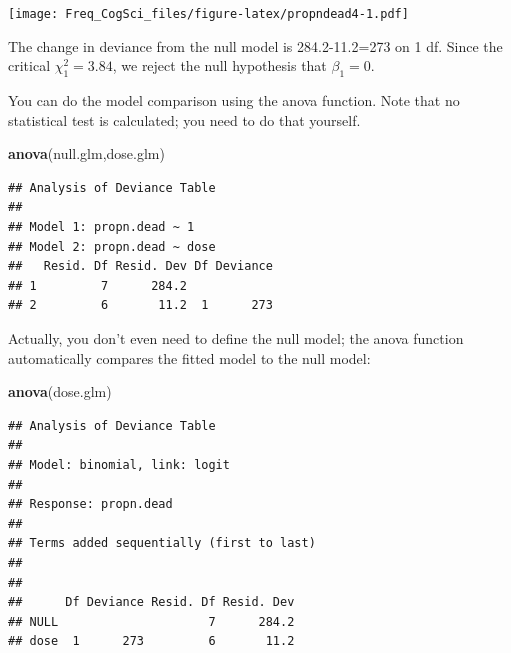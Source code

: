 \documentclass[12pt,]{krantz}
\newenvironment{Shaded}{\begin{snugshade}}{\end{snugshade}}
\newcommand{\DataTypeTok}[1]{\textcolor[rgb]{0.13,0.29,0.53}{#1}}
\newcommand{\DecValTok}[1]{\textcolor[rgb]{0.00,0.00,0.81}{#1}}
\newcommand{\KeywordTok}[1]{\textcolor[rgb]{0.13,0.29,0.53}{\textbf{#1}}}
\newcommand{\NormalTok}[1]{#1}
\newcommand{\OperatorTok}[1]{\textcolor[rgb]{0.81,0.36,0.00}{\textbf{#1}}}
\newcommand{\StringTok}[1]{\textcolor[rgb]{0.31,0.60,0.02}{#1}}
\begin{document}
\begin{Shaded}
\end{Shaded}

\texttt{[image: Freq\_CogSci\_files/figure-latex/propndead4-1.pdf]}

The change in deviance from the null model is 284.2-11.2=273 on 1 df. Since the critical \(\chi_1^2 = 3.84\), we reject the null hypothesis that \(\beta_1 = 0\).

You can do the model comparison using the anova function. Note that no statistical test is calculated; you need to do that yourself.

\begin{Shaded}
\begin{Highlighting}[]
\KeywordTok{anova}\NormalTok{(null.glm,dose.glm)}
\end{Highlighting}
\end{Shaded}

\begin{verbatim}
## Analysis of Deviance Table
## 
## Model 1: propn.dead ~ 1
## Model 2: propn.dead ~ dose
##   Resid. Df Resid. Dev Df Deviance
## 1         7      284.2            
## 2         6       11.2  1      273
\end{verbatim}

Actually, you don't even need to define the null model; the anova function automatically compares the fitted model to the null model:

\begin{Shaded}
\begin{Highlighting}[]
\KeywordTok{anova}\NormalTok{(dose.glm)}
\end{Highlighting}
\end{Shaded}

\begin{verbatim}
## Analysis of Deviance Table
## 
## Model: binomial, link: logit
## 
## Response: propn.dead
## 
## Terms added sequentially (first to last)
## 
## 
##      Df Deviance Resid. Df Resid. Dev
## NULL                     7      284.2
## dose  1      273         6       11.2
\end{verbatim}
\end{document}

